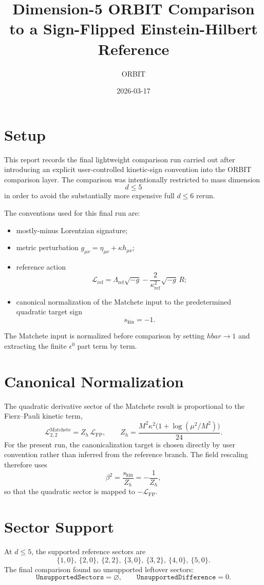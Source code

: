 \documentclass[11pt]{article}
\title{Dimension-5 ORBIT Comparison to a Sign-Flipped Einstein-Hilbert Reference}
\author{ORBIT}
\date{2026-03-17}
\begin{document}
\maketitle
\tableofcontents

\section{Setup}
This report records the final lightweight comparison run carried out after introducing an explicit user-controlled kinetic-sign convention into the ORBIT comparison layer. The comparison was intentionally restricted to mass dimension
\[
d \le 5
\]
in order to avoid the substantially more expensive full \(d \le 6\) rerun.

The conventions used for this final run are:
\begin{itemize}
\item mostly-minus Lorentzian signature;
\item metric perturbation \(g_{\mu\nu} = \eta_{\mu\nu} + \kappa h_{\mu\nu}\);
\item reference action
\[
\mathcal{L}_{\mathrm{ref}}
=
\Lambda_{\mathrm{ref}} \sqrt{-g}
- \frac{2}{\kappa_{\mathrm{ref}}^2}\sqrt{-g}\,R;
\]
\item canonical normalization of the Matchete input to the predetermined quadratic target sign
\[
s_{\mathrm{kin}}=-1.
\]
\end{itemize}

The Matchete input is normalized before comparison by setting \(hbar \to 1\) and extracting the finite \(\epsilon^0\) part term by term.

\section{Canonical Normalization}
The quadratic derivative sector of the Matchete result is proportional to the Fierz--Pauli kinetic term,
\[
\mathcal{L}^{\mathrm{Matchete}}_{2,2}
=
Z_h\,\mathcal{L}_{\mathrm{FP}},
\qquad
Z_h=\frac{M^2\kappa^2\bigl(1+\log(\mu^2/M^2)\bigr)}{24}.
\]
For the present run, the canonicalization target is chosen directly by user convention rather than inferred from the reference branch. The field rescaling therefore uses
\[
\beta^2=\frac{s_{\mathrm{kin}}}{Z_h}=-\frac{1}{Z_h},
\]
so that the quadratic sector is mapped to \(-\mathcal{L}_{\mathrm{FP}}\).

\section{Sector Support}
At \(d \le 5\), the supported reference sectors are
\[
\{1,0\},\ \{2,0\},\ \{2,2\},\ \{3,0\},\ \{3,2\},\ \{4,0\},\ \{5,0\}.
\]
The final comparison found no unsupported leftover sectors:
\[
\texttt{UnsupportedSectors} = \varnothing,
\qquad
\texttt{UnsupportedDifference}=0.
\]
\end{document}
